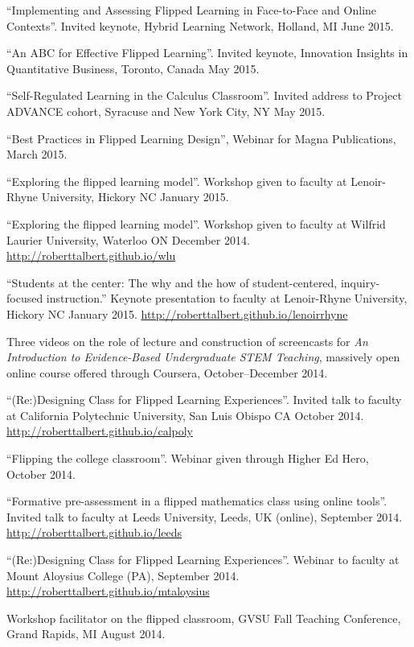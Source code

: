 \documentclass[letterpaper]{article}
\renewenvironment{itemize}{
  \begin{list}{}{
    \setlength{\leftmargin}{1.5em}
	\setlength{\itemsep}{0in}
  }
}{
  \end{list}
}
\begin{document}
\begin{itemize}
	\item ``Implementing and Assessing Flipped Learning in Face-to-Face and Online Contexts''. Invited keynote, Hybrid Learning Network, Holland, MI June 2015.
	\item ``An ABC for Effective Flipped Learning''. Invited keynote, Innovation Insights in Quantitative Business, Toronto, Canada May 2015.
	\item ``Self-Regulated Learning in the Calculus Classroom''. Invited address to Project ADVANCE cohort, Syracuse and New York City, NY May 2015.
	\item ``Best Practices in Flipped Learning Design'', Webinar for Magna Publications, March 2015.
	\item ``Exploring the flipped learning model''. Workshop given to faculty at Lenoir-Rhyne University, Hickory NC January 2015.
	\item ``Exploring the flipped learning model''. Workshop given to faculty at Wilfrid Laurier University, Waterloo ON December 2014. \url{http://roberttalbert.github.io/wlu}
	\item ``Students at the center: The why and the how of student-centered, inquiry-focused instruction.'' Keynote presentation to faculty at Lenoir-Rhyne University, Hickory NC January 2015. \url{http://roberttalbert.github.io/lenoirrhyne}
	\item Three videos on the role of lecture and construction of screencasts for \emph{An Introduction to Evidence-Based Undergraduate STEM Teaching}, massively open online course offered through Coursera, October--December 2014.
	\item ``(Re:)Designing Class for Flipped Learning Experiences''. Invited talk to faculty at California Polytechnic University, San Luis Obispo CA October 2014. \url{http://roberttalbert.github.io/calpoly}
	\item ``Flipping the college classroom''. Webinar given through Higher Ed Hero, October 2014.
	\item ``Formative pre-assessment in a flipped mathematics class using online tools''. Invited talk to faculty at Leeds University, Leeds, UK (online), September 2014. \url{http://roberttalbert.github.io/leeds}
	\item ``(Re:)Designing Class for Flipped Learning Experiences''. Webinar to faculty at Mount Aloysius College (PA), September 2014. \url{http://roberttalbert.github.io/mtaloysius}
	\item Workshop facilitator on the flipped classroom, GVSU Fall Teaching Conference, Grand Rapids, MI August 2014.

\end{itemize}
\end{document}
